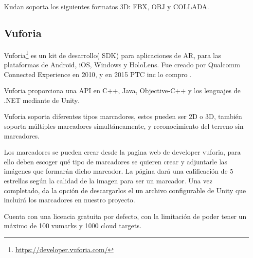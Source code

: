 Kudan soporta los siguientes formatos 3D: FBX, OBJ y COLLADA.

\subsection{Vuforia}
Vuforia\footnote{\url{https://developer.vuforia.com/}} es un kit de desarrollo( SDK) para aplicaciones de AR, para las plataformas de Android, iOS, Windows y HoloLens. Fue creado por Qualcomm Connected Experience en 2010, y en 2015 PTC inc lo compro \cite{simonetti2013vuforia}.

Vuforia proporciona una API en C++, Java, Objective-C++ y los lenguajes de .NET mediante de Unity.

Vuforia soporta diferentes tipos marcadores, estos pueden ser 2D o 3D, también soporta múltiples marcadores simultáneamente, y reconocimiento del terreno sin marcadores.

Los marcadores se pueden crear desde la pagina web de developer vuforia, para ello deben escoger qué tipo de marcadores se quieren crear y adjuntarle las imágenes que formarán dicho marcador. La página dará una calificación de 5 estrellas según la calidad de la imagen para ser un marcador. Una vez completado, da la opción de descargarlos el un archivo configurable de Unity que incluirá los marcadores en nuestro proyecto.



Cuenta con una licencia gratuita por defecto, con la limitación de poder tener un máximo de 100 vumarks y 1000 cloud targets.

